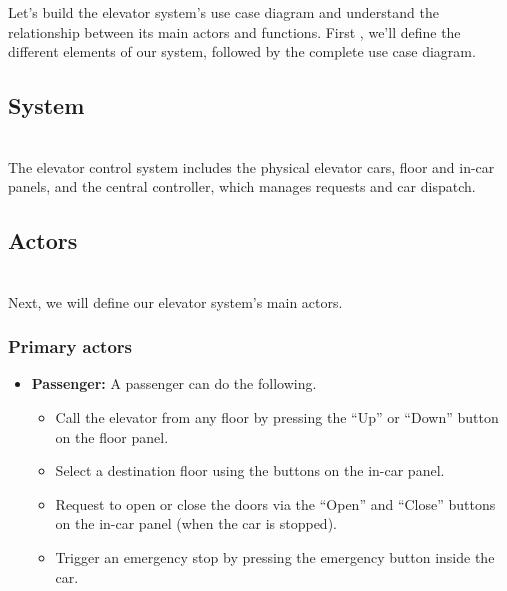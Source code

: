 

Let's build the elevator system's use case diagram and understand the relationship between its main actors and functions. First , we'll define the different elements of our system, followed by the complete use case diagram.

\subsection{System}\label{7uCqhm_LIxkOmGGiLjF54}
\\
The elevator control system includes the physical elevator cars, floor and in-car panels, and the central controller, which manages requests and car dispatch.

\subsection{Actors}\label{cVFR67mrSSU28vq0KCkqN}
\\
Next, we will define our elevator system's main actors.

\subsubsection{Primary actors}\label{mLZUDJBj8t6J1LsAxw1MU}

\begin{itemize}
\item
\protect{}\label{8BbizgMfsPvqsuVB_IIpC}
\textbf{Passenger:} A passenger can do the following.

\begin{itemize}
\item
Call the elevator from any floor by pressing the ``Up'' or ``Down'' button on the floor panel.
\item
Select a destination floor using the buttons on the in-car panel.
\item
Request to open or close the doors via the ``Open'' and ``Close'' buttons on the in-car panel (when the car is stopped).
\item
Trigger an emergency stop by pressing the emergency button inside the car.
\end{itemize}
\end{itemize}


